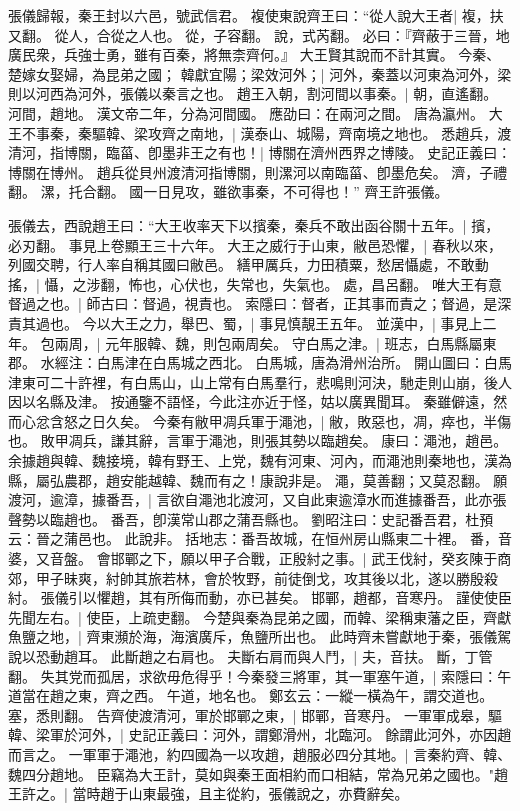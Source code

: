 張儀歸報，秦王封以六邑，號武信君。
複使東說齊王曰：“從人說大王者|{
	複，扶又翻。
	從人，合從之人也。
	從，子容翻。
	說，式芮翻。
}
必曰：『齊蔽于三晉，地廣民衆，兵強士勇，雖有百秦，將無柰齊何。』
大王賢其說而不計其實。
今秦、楚嫁女娶婦，為昆弟之國；
韓獻宜陽；梁效河外；|{
	河外，秦蓋以河東為河外，梁則以河西為河外，張儀以秦言之也。
}
趙王入朝，割河間以事秦。|{
	朝，直遙翻。
	河間，趙地。
	漢文帝二年，分為河間國。
	應劭曰：在兩河之間。
	唐為瀛州。
}
大王不事秦，秦驅韓、梁攻齊之南地，|{
	漢泰山、城陽，齊南境之地也。
}
悉趙兵，渡清河，指博關，臨菑、卽墨非王之有也！|{
	博關在濟州西界之博陵。
	史記正義曰：博關在博州。
	趙兵從貝州渡清河指博關，則漯河以南臨菑、卽墨危矣。
	濟，子禮翻。
	漯，托合翻。
}
國一日見攻，雖欲事秦，不可得也！”
齊王許張儀。

張儀去，西說趙王曰：“大王收率天下以擯秦，秦兵不敢出函谷關十五年。|{
	擯，必刃翻。
	事見上卷顯王三十六年。
}
大王之威行于山東，敝邑恐懼，|{
	春秋以來，列國交聘，行人率自稱其國曰敝邑。
}
繕甲厲兵，力田積粟，愁居懾處，不敢動搖，|{
	懾，之涉翻，怖也，心伏也，失常也，失氣也。
	處，昌呂翻。
}
唯大王有意督過之也。|{
	師古曰：督過，視責也。
	索隱曰：督者，正其事而責之；督過，是深責其過也。
}
今以大王之力，舉巴、蜀，|{
	事見慎靚王五年。
}
並漢中，|{
	事見上二年。
}
包兩周，|{
	元年服韓、魏，則包兩周矣。
}
守白馬之津。|{
	班志，白馬縣屬東郡。
	水經注：白馬津在白馬城之西北。
	白馬城，唐為滑州治所。
	開山圖曰：白馬津東可二十許裡，有白馬山，山上常有白馬羣行，悲鳴則河決，馳走則山崩，後人因以名縣及津。
	按通鑒不語怪，今此注亦近于怪，姑以廣異聞耳。
}
秦雖僻遠，然而心忿含怒之日久矣。
	今秦有敝甲凋兵軍于澠池，|{
	敝，敗惡也，凋，瘁也，半傷也。
	敗甲凋兵，謙其辭，言軍于澠池，則張其勢以臨趙矣。
	康曰：澠池，趙邑。
	余據趙與韓、魏接境，韓有野王、上党，魏有河東、河內，而澠池則秦地也，漢為縣，屬弘農郡，趙安能越韓、魏而有之！康說非是。
	澠，莫善翻；又莫忍翻。
}
願渡河，逾漳，據番吾，|{
	言欲自澠池北渡河，又自此東逾漳水而進據番吾，此亦張聲勢以臨趙也。
	番吾，卽漢常山郡之蒲吾縣也。
	劉昭注曰：史記番吾君，杜預云：晉之蒲邑也。
	此說非。
	括地志：番吾故城，在恒州房山縣東二十裡。
	番，音婆，又音盤。
}
會邯鄲之下，願以甲子合戰，正殷紂之事。|{
	武王伐紂，癸亥陳于商郊，甲子昧爽，紂帥其旅若林，會於牧野，前徒倒戈，攻其後以北，遂以勝殷殺紂。
	張儀引以懼趙，其有所侮而動，亦已甚矣。
	邯鄲，趙都，音寒丹。
}
謹使使臣先聞左右。|{
	使臣，上疏吏翻。
}
今楚與秦為昆弟之國，而韓、梁稱東藩之臣，齊獻魚鹽之地，|{
	齊東瀕於海，海濱廣斥，魚鹽所出也。
	此時齊未嘗獻地于秦，張儀駕說以恐動趙耳。
}
此斷趙之右肩也。
	夫斷右肩而與人鬥，|{
	夫，音扶。
	斷，丁管翻。
}
失其党而孤居，求欲毋危得乎！今秦發三將軍，其一軍塞午道，|{
	索隱曰：午道當在趙之東，齊之西。
	午道，地名也。
	鄭玄云：一縱一橫為午，謂交道也。
	塞，悉則翻。
}
告齊使渡清河，軍於邯鄲之東，|{
	邯鄲，音寒丹。
}
一軍軍成皋，驅韓、梁軍於河外，|{
	史記正義曰：河外，謂鄭滑州，北臨河。
	餘謂此河外，亦因趙而言之。
}
一軍軍于澠池，約四國為一以攻趙，趙服必四分其地。|{
	言秦約齊、韓、魏四分趙地。
}
臣竊為大王計，莫如與秦王面相約而口相結，常為兄弟之國也。"趙王許之。|{
	當時趙于山東最強，且主從約，張儀說之，亦費辭矣。
}


